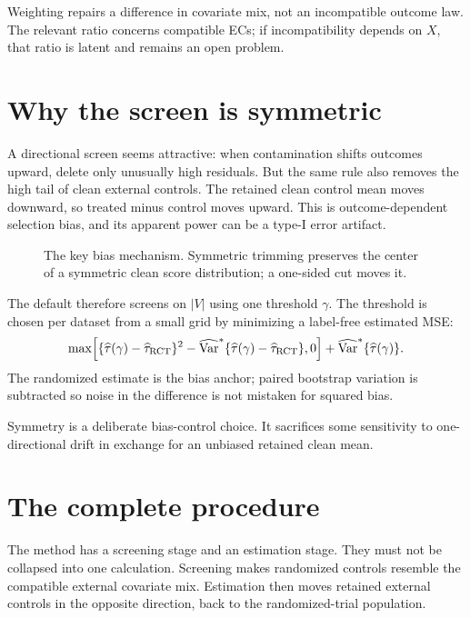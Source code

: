 \documentclass[10pt]{article}
\newcommand{\fullfig}[1]{\resizebox{\linewidth}{!}{}}
\begin{document}
\begin{takeaway}
Weighting repairs a difference in covariate mix, not an incompatible outcome law. The relevant ratio concerns compatible ECs; if incompatibility depends on $X$, that ratio is latent and remains an open problem.
\end{takeaway}

\clearpage
\section{Why the screen is symmetric}

A directional screen seems attractive: when contamination shifts outcomes upward, delete only unusually high residuals. But the same rule also removes the high tail of clean external controls. The retained clean control mean moves downward, so treated minus control moves upward. This is outcome-dependent selection bias, and its apparent power can be a type-I error artifact.

\begin{figure}[!h]
\centering\fullfig{symmetry_bias.tex}
\caption{The key bias mechanism. Symmetric trimming preserves the center of a symmetric clean score distribution; a one-sided cut moves it.}
\end{figure}

The default therefore screens on $|V|$ using one threshold $\gamma$. The threshold is chosen per dataset from a small grid by minimizing a label-free estimated MSE:
\[
\max\!\left[
\{\widehat\tau(\gamma)-\widehat\tau_{\rm RCT}\}^2
-\widehat{\mathrm{Var}}^*\{\widehat\tau(\gamma)-\widehat\tau_{\rm RCT}\},0
\right]
+\widehat{\mathrm{Var}}^*\{\widehat\tau(\gamma)\}.
\]
The randomized estimate is the bias anchor; paired bootstrap variation is subtracted so noise in the difference is not mistaken for squared bias.

\begin{takeaway}
Symmetry is a deliberate bias-control choice. It sacrifices some sensitivity to one-directional drift in exchange for an unbiased retained clean mean.
\end{takeaway}

\clearpage
\section{The complete procedure}

The method has a screening stage and an estimation stage. They must not be collapsed into one calculation. Screening makes randomized controls resemble the compatible external covariate mix. Estimation then moves retained external controls in the opposite direction, back to the randomized-trial population.
\end{document}
